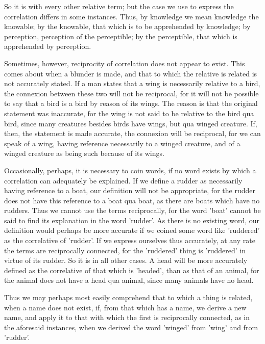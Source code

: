 So it is with every other relative term; but the case we use to express
the correlation differs in some instances. Thus, by knowledge we mean
knowledge the knowable; by the knowable, that which is to be
apprehended by knowledge; by perception, perception of the perceptible;
by the perceptible, that which is apprehended by perception.

Sometimes, however, reciprocity of correlation does not appear to
exist. This comes about when a blunder is made, and that to which the
relative is related is not accurately stated. If a man states that a
wing is necessarily relative to a bird, the connexion between these two
will not be reciprocal, for it will not be possible to say that a bird
is a bird by reason of its wings. The reason is that the original
statement was inaccurate, for the wing is not said to be relative to
the bird qua bird, since many creatures besides birds have wings, but
qua winged creature. If, then, the statement is made accurate, the
connexion will be reciprocal, for we can speak of a wing, having
reference necessarily to a winged creature, and of a winged creature as
being such because of its wings.

Occasionally, perhaps, it is necessary to coin words, if no word exists
by which a correlation can adequately be explained. If we define a
rudder as necessarily having reference to a boat, our definition will
not be appropriate, for the rudder does not have this reference to a
boat qua boat, as there are boats which have no rudders. Thus we cannot
use the terms reciprocally, for the word 'boat' cannot be said to find
its explanation in the word 'rudder'. As there is no existing word, our
definition would perhaps be more accurate if we coined some word like
'ruddered' as the correlative of 'rudder'. If we express ourselves thus
accurately, at any rate the terms are reciprocally connected, for the
'ruddered' thing is 'ruddered' in virtue of its rudder. So it is in all
other cases. A head will be more accurately defined as the correlative
of that which is 'headed', than as that of an animal, for the animal
does not have a head qua animal, since many animals have no head.

Thus we may perhaps most easily comprehend that to which a thing is
related, when a name does not exist, if, from that which has a name, we
derive a new name, and apply it to that with which the first is
reciprocally connected, as in the aforesaid instances, when we derived
the word 'winged' from 'wing' and from 'rudder'.

